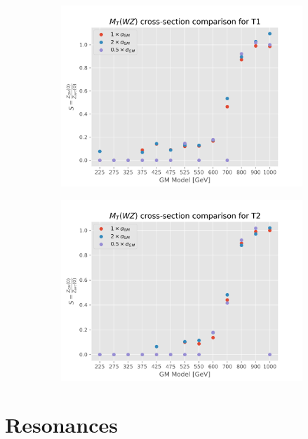 \documentclass[../Bachelorarbeit.tex]{subfiles}
\begin{document}
\begin{figure}[h]
\begin{subfigure}{0.45\textwidth}
    \end{subfigure}
    \begin{subfigure}{0.45\textwidth}
        \includegraphics[width=\textwidth]{Plots/gm_relevanze/MTWZ_comparision_T1.png}

    \end{subfigure}
    \begin{subfigure}{0.45\textwidth}
        \includegraphics[width=\textwidth]{Plots/gm_relevanze/MTWZ_comparision_T2.png}

    \end{subfigure}

\end{figure}

\section{Resonances}
\label{sec:further_resonace}
\end{document}
